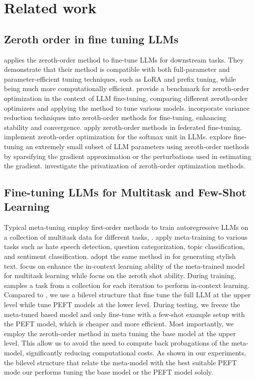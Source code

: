 \section{Related work}
\subsection{Zeroth order in fine tuning LLMs}
\cite{MalladiGNDL0A23} applies the zeroth-order method to fine-tune LLMs for downstream tasks. They demonstrate that their method is compatible with both full-parameter and parameter-efficient tuning techniques, such as LoRA and prefix tuning, while being much more computationally efficient. \cite{ZhLiHo24} provide a benchmark for zeroth-order optimization in the context of LLM fine-tuning, comparing different zeroth-order optimizers and applying the method to tune various models. \cite{GautamPZRH24} incorporate variance reduction techniques into zeroth-order methods for fine-tuning, enhancing stability and convergence. \cite{QinCQDLD24, LingCYL024} apply zeroth-order methods in federated fine-tuning. \cite{DengLMS24} implement zeroth-order optimization for the softmax unit in LLMs. \cite{GuoLZLY24, LiuZGCHY24} explore fine-tuning an extremely small subset of LLM parameters using zeroth-order methods by sparsifying the gradient approximation or the perturbations used in estimating the gradient. \cite{TaPNMM24} investigate the privatization of zeroth-order optimization methods.

\subsection{Fine-tuning LLMs for Multitask and Few-Shot Learning}
Typical meta-tuning employ first-order methods to train autoregressive LLMs on a collection of multitask data for different tasks, \cite{ZhongLZK21,MinLZH22,GuoXR24}.  
\cite{ZhongLZK21} apply meta-training to various tasks such as hate speech detection, question categorization, topic classification, and sentiment classification. \cite{GuoXR24} adopt the same method in \cite{MinLZH22} for generating stylish text.
\cite{MinLZH22} focus on enhance the in-context learning ability of the meta-trained model for multitask learning while \cite{ZhongLZK21} focus on the zeroth shot ability.
During training, \cite{MinLZH22} samples a task from a collection for each iteration to perform in-context learning. Compared to \cite{ZhongLZK21,MinLZH22}, we use a bilevel structure that  fine tune the full LLM at the upper level while tune PEFT models at the lower level.
During testing, we freeze the meta-tuned based model and only fine-tune with a few-shot example setup with the PEFT model, which is cheaper and more efficient.
Most importantly, we employ the zeroth-order method in  meta tuning the base model at the upper level. This allow us to avoid the need to compute back probagations of the meta-model, significantly reducing computational costs.
 As shown in our experiments, the bilevel structure that relate the meta-model with the best suitable PEFT mode our performs tuning the base model or the PEFT model sololy. 

